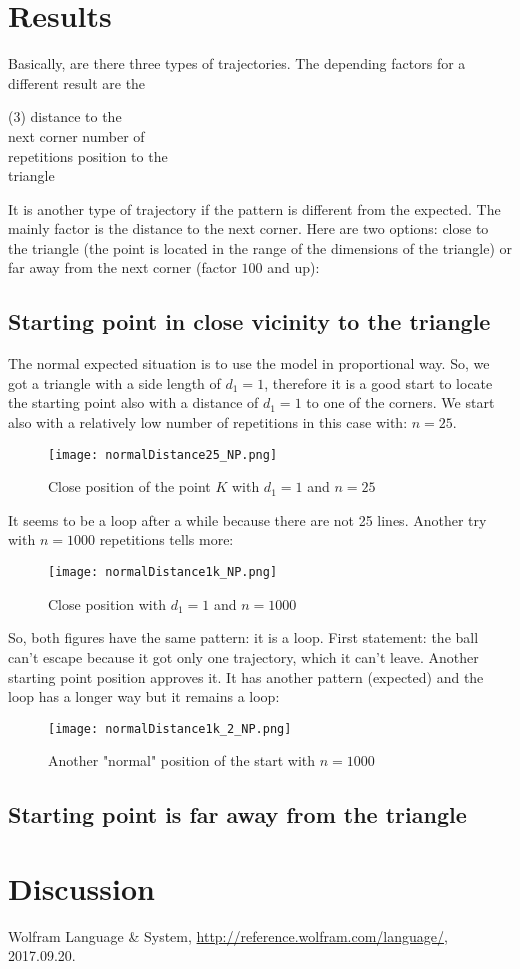 \documentclass[11pt,a4paper]{article}
\begin{document}
\section{Results}
Basically, are there three types of trajectories. The depending factors for a different result are the
\begin{tasks}(3)
\task distance to the \\next corner
\task number of \\repetitions
\task position to the \\triangle
\end{tasks}
It is another type of trajectory if the pattern is different from the expected. The mainly factor is the distance to the next corner. Here are two options: close to the triangle (the point is located in the range of the dimensions of the triangle) or far away from the next corner (factor \(100\) and up):
 \subsection{Starting point in close vicinity to the triangle}
The normal expected situation is to use the model in proportional way. So, we got a triangle with a side length of \(d_1=1\), therefore it is a good start to locate the starting point also with a distance of \(d_1=1\) to one of the corners. We start also with a relatively low number of repetitions in this case with: \(n=25\).
\begin{figure}[h]
\centering
\texttt{[image: normalDistance25\_NP.png]}
\caption{Close position of the point \(K\) with \(d_1=1\) and \(n=25\)}
\end{figure}
It seems to be a loop after a while because there are not 25 lines. Another try with \(n=1000\) repetitions tells more:
\begin{figure}[h]
\centering
\texttt{[image: normalDistance1k\_NP.png]}
\caption{Close position with \(d_1=1\) and \(n=1000\)}
\end{figure}
So, both figures have the same pattern: it is a loop. First statement: the ball can’t escape because it got only one trajectory, which it can’t leave. Another starting point position approves it. It has another pattern (expected) and the loop has a longer way but it remains a loop:
\begin{figure}[h]
\centering
\texttt{[image: normalDistance1k\_2\_NP.png]}
\caption{Another "normal" position of the start with \(n=1000\)}
\end{figure}

 \subsection{Starting point is far away from the triangle}
\section{Discussion}


\begin{thebibliography}{99}

 Wolfram Language \& System, \url{http://reference.wolfram.com/language/}, 2017.09.20.


\end{thebibliography}
\end{document}
